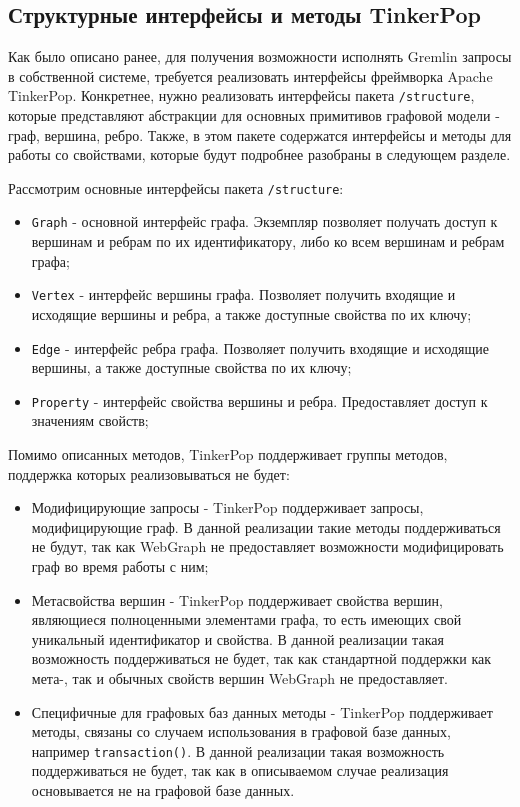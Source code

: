 \documentclass[times,specification,annotation]{itmo-student-thesis}
\begin{document}
\subsection{Структурные интерфейсы и методы TinkerPop}

Как было описано ранее, для получения возможности исполнять Gremlin запросы в собственной системе, требуется реализовать интерфейсы фреймворка Apache TinkerPop. Конкретнее, нужно реализовать интерфейсы пакета \texttt{/structure}, которые представляют абстракции для основных примитивов графовой модели - граф, вершина, ребро. Также, в этом пакете содержатся интерфейсы и методы для работы со свойствами, которые будут подробнее разобраны в следующем разделе.

Рассмотрим основные интерфейсы пакета \texttt{/structure}:

\begin{itemize}
    \item \texttt{Graph} - основной интерфейс графа. Экземпляр позволяет получать доступ к вершинам и ребрам по их идентификатору, либо ко всем вершинам и ребрам графа;
    \item \texttt{Vertex} - интерфейс вершины графа. Позволяет получить входящие и исходящие вершины и ребра, а также доступные свойства по их ключу;
    \item \texttt{Edge} - интерфейс ребра графа. Позволяет получить входящие и исходящие вершины, а также доступные свойства по их ключу;
    \item \texttt{Property} - интерфейс свойства вершины и ребра. Предоставляет доступ к значениям свойств;
\end{itemize}

Помимо описанных методов, TinkerPop поддерживает группы методов, поддержка которых реализовываться не будет:

\begin{itemize}
    \item Модифицирующие запросы - TinkerPop поддерживает запросы, модифицирующие граф. В данной реализации такие методы поддерживаться не будут, так как WebGraph не предоставляет возможности модифицировать граф во время работы с ним;
    \item Метасвойства вершин - TinkerPop поддерживает свойства вершин, являющиеся полноценными элементами графа, то есть имеющих свой уникальный идентификатор и свойства. В данной реализации такая возможность поддерживаться не будет, так как стандартной поддержки как мета-, так и обычных свойств вершин WebGraph не предоставляет.
    \item Специфичные для графовых баз данных методы - TinkerPop поддерживает методы, связаны со случаем использования в графовой базе данных, например \texttt{transaction()}. В данной реализации такая возможность поддерживаться не будет, так как в описываемом случае реализация основывается не на графовой базе данных.
\end{itemize}
\end{document}
